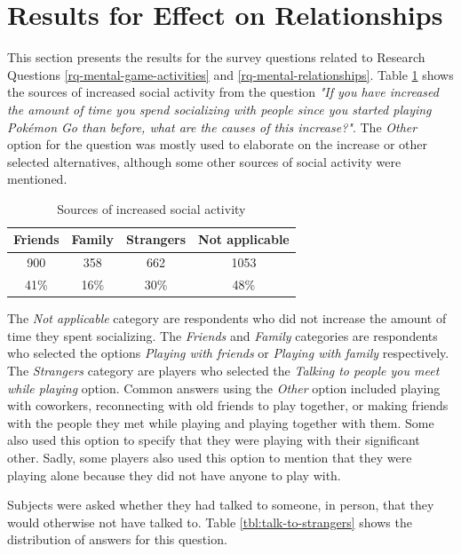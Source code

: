 \section{Results for Effect on Relationships}

This section presents the results for the survey questions related to Research Questions \ref{rq-mental-game-activities} and \ref{rq-mental-relationships}. Table \ref{tbl:increased-social-activity-sources} shows the sources of increased social activity from the question \emph{"If you have increased the amount of time you spend socializing with people since you started playing Pokémon Go than before, what are the causes of this increase?"}. The \emph{Other} option for the question was mostly used to elaborate on the increase or other selected alternatives, although some other sources of social activity were mentioned.

\begin{table}[h]
	\centering
	\caption{Sources of increased social activity}
	\label{tbl:increased-social-activity-sources}
	\begin{tabular}{|c|c|c|c|}
		\hline
		\textbf{Friends} & \textbf{Family} & \textbf{Strangers} & \textbf{Not applicable}\\
		\hline\hline
		900		& 358	& 662	& 1053\\
		41\%	& 16\%	& 30\%	& 48\%\\\hline
	\end{tabular}
\end{table}

The \emph{Not applicable} category are respondents who did not increase the amount of time they spent socializing. The \emph{Friends} and \emph{Family} categories are respondents who selected the options \emph{Playing with friends} or \emph{Playing with family} respectively. The \emph{Strangers} category are players who selected the \emph{Talking to people you meet while playing} option. Common answers using the \emph{Other} option included playing with coworkers, reconnecting with old friends to play together, or making friends with the people they met while playing and playing together with them. Some also used this option to specify that they were playing with their significant other. Sadly, some players also used this option to mention that they were playing alone because they did not have anyone to play with.

Subjects were asked whether they had talked to someone, in person, that they would otherwise not have talked to. Table \ref{tbl:talk-to-strangers} shows the distribution of answers for this question.

